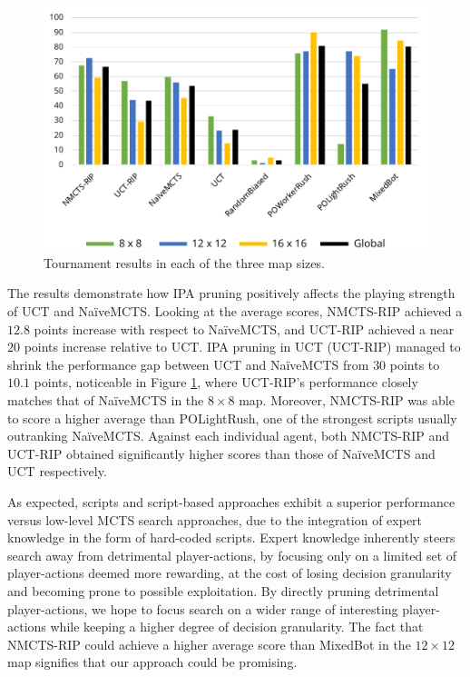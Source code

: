 \documentclass[conference]{IEEEtran}
\begin{document}
\begin{figure}[!t]
\begin{center}
	\includegraphics[width=1\columnwidth]{figs/TR.pdf}
	\caption{Tournament results in each of the three map sizes.}
	\label{TournamentResultsAllMaps}
\end{center}
\end{figure}

The results demonstrate how IPA pruning positively affects the playing strength of UCT and NaïveMCTS. Looking at the average scores, NMCTS-RIP achieved a $12.8$ points increase with respect to NaïveMCTS, and UCT-RIP achieved a near $20$ points increase relative to UCT. IPA pruning in UCT (UCT-RIP) managed to shrink the performance gap between UCT and NaïveMCTS from $30$ points to $10.1$ points, noticeable in Figure \ref{TournamentResultsAllMaps}, where UCT-RIP's performance closely matches that of NaïveMCTS in the $8\times8$ map. Moreover, NMCTS-RIP was able to score a higher average than POLightRush, one of the strongest scripts usually outranking NaïveMCTS. Against each individual agent, both NMCTS-RIP and UCT-RIP obtained significantly higher scores than those of NaïveMCTS and UCT respectively.

As expected, scripts and script-based approaches exhibit a superior performance versus low-level MCTS search approaches, due to the integration of expert knowledge in the form of hard-coded scripts. Expert knowledge inherently steers search away from detrimental player-actions, by focusing only on a limited set of player-actions deemed more rewarding, at the cost of losing decision granularity and becoming prone to possible exploitation. By directly pruning detrimental player-actions, we hope to focus search on a wider range of interesting player-actions while keeping a higher degree of decision granularity. The fact that NMCTS-RIP could achieve a higher average score than MixedBot in the $12\times12$ map signifies that our approach could be promising.
\end{document}
